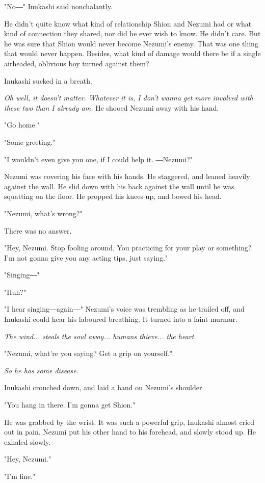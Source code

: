 "No―" Inukashi said nonchalantly.

He didn't quite know what kind of relationship Shion and Nezumi had or
what kind of connection they shared, nor did he ever wish to know. He
didn't care. But he was sure that Shion would never become Nezumi's
enemy. That was one thing that would never happen. Besides, what kind of
damage would there be if a single airheaded, oblivious boy turned
against them?

Inukashi sucked in a breath.

\emph{Oh well, it doesn't matter. Whatever it is, I don't wanna get more
involved with these two than I already am.} He shooed Nezumi away with
his hand.

"Go home."

"Some greeting."

"I wouldn't even give you one, if I could help it. ―Nezumi?"

Nezumi was covering his face with his hands. He staggered, and leaned
heavily against the wall. He slid down with his back against the wall
until he was squatting on the floor. He propped his knees up, and bowed
his head.

"Nezumi, what's wrong?"

There was no answer.

"Hey, Nezumi. Stop fooling around. You practicing for your play or
something? I'm not gonna give you any acting tips, just saying."

"Singing―"

"Huh?"

"I hear singing―again―" Nezumi's voice was trembling as he trailed off,
and Inukashi could hear his laboured breathing. It turned into a faint
murmur.

\emph{The wind... steals the soul away... humans thieve... the heart.}

"Nezumi, what're you saying? Get a grip on yourself."

\emph{So he has some disease.}

Inukashi crouched down, and laid a hand on Nezumi's shoulder.

"You hang in there. I'm gonna get Shion."

He was grabbed by the wrist. It was such a powerful grip, Inukashi
almost cried out in pain. Nezumi put his other hand to his forehead, and
slowly stood up. He exhaled slowly.

"Hey, Nezumi."

"I'm fine."

